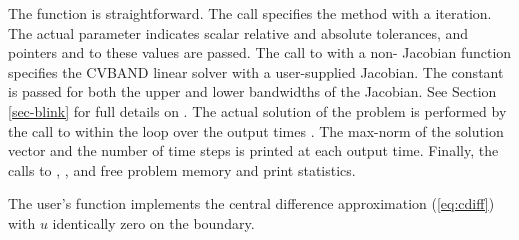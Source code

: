 The  function is straightforward.
The  call specifies the  method with
a  iteration. The  actual parameter indicates scalar
relative and absolute tolerances, and pointers 
and  to these values are passed.
The call to  with a non- Jacobian function 
specifies the CVBAND linear solver with a user-supplied Jacobian. The constant
 is passed for both the upper and lower bandwidths of the Jacobian.
See Section \ref{sec-blink} for full details on .
The actual solution of the problem is performed by the call to 
within the loop over the output times .  The max-norm of the
solution vector and the number of time steps is printed at each output time.
Finally, the calls to , , and 
free problem memory and print statistics.

The user's  function implements the central difference approximation
(\ref{eq:cdiff}) with $u$ identically zero on the boundary. 

